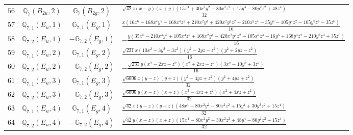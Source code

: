\documentclass[fleqn,8pt,landscape]{jsarticle}
\begin{document}
\begin{table}[ht!]
\begin{center}
\begin{tabular}{cccl}
$ 56 $ & $ \mathbb{Q}_{7}(B_{2u},2) $ & $ \mathbb{G}_{7}(B_{2g},2) $ & $ \frac{\sqrt{42} z \left(x - y\right) \left(x + y\right) \left(15 x^{4} + 30 x^{2} y^{2} - 80 x^{2} z^{2} + 15 y^{4} - 80 y^{2} z^{2} + 48 z^{4}\right)}{32} $ \\
$ 57 $ & $ \mathbb{Q}_{7,1}(E_{u},1) $ & $ \mathbb{G}_{7,1}(E_{g},1) $ & $ \frac{x \left(16 x^{6} - 168 x^{4} y^{2} - 168 x^{4} z^{2} + 210 x^{2} y^{4} + 420 x^{2} y^{2} z^{2} + 210 x^{2} z^{4} - 35 y^{6} - 105 y^{4} z^{2} - 105 y^{2} z^{4} - 35 z^{6}\right)}{16} $ \\
$ 58 $ & $ \mathbb{Q}_{7,2}(E_{u},1) $ & $ -\mathbb{G}_{7,2}(E_{g},1) $ & $ - \frac{y \left(35 x^{6} - 210 x^{4} y^{2} + 105 x^{4} z^{2} + 168 x^{2} y^{4} - 420 x^{2} y^{2} z^{2} + 105 x^{2} z^{4} - 16 y^{6} + 168 y^{4} z^{2} - 210 y^{2} z^{4} + 35 z^{6}\right)}{16} $ \\
$ 59 $ & $ \mathbb{Q}_{7,1}(E_{u},2) $ & $ \mathbb{G}_{7,1}(E_{g},2) $ & $ \frac{\sqrt{231} x \left(10 x^{2} - 3 y^{2} - 3 z^{2}\right) \left(y^{2} - 2 y z - z^{2}\right) \left(y^{2} + 2 y z - z^{2}\right)}{16} $ \\
$ 60 $ & $ \mathbb{Q}_{7,2}(E_{u},2) $ & $ -\mathbb{G}_{7,2}(E_{g},2) $ & $ - \frac{\sqrt{231} y \left(x^{2} - 2 x z - z^{2}\right) \left(x^{2} + 2 x z - z^{2}\right) \left(3 x^{2} - 10 y^{2} + 3 z^{2}\right)}{16} $ \\
$ 61 $ & $ \mathbb{Q}_{7,1}(E_{u},3) $ & $ \mathbb{G}_{7,1}(E_{g},3) $ & $ \frac{\sqrt{6006} x \left(y - z\right) \left(y + z\right) \left(y^{2} - 4 y z + z^{2}\right) \left(y^{2} + 4 y z + z^{2}\right)}{32} $ \\
$ 62 $ & $ \mathbb{Q}_{7,2}(E_{u},3) $ & $ -\mathbb{G}_{7,2}(E_{g},3) $ & $ \frac{\sqrt{6006} y \left(x - z\right) \left(x + z\right) \left(x^{2} - 4 x z + z^{2}\right) \left(x^{2} + 4 x z + z^{2}\right)}{32} $ \\
$ 63 $ & $ \mathbb{Q}_{7,1}(E_{u},4) $ & $ \mathbb{G}_{7,1}(E_{g},4) $ & $ \frac{\sqrt{42} x \left(y - z\right) \left(y + z\right) \left(48 x^{4} - 80 x^{2} y^{2} - 80 x^{2} z^{2} + 15 y^{4} + 30 y^{2} z^{2} + 15 z^{4}\right)}{32} $ \\
$ 64 $ & $ \mathbb{Q}_{7,2}(E_{u},4) $ & $ -\mathbb{G}_{7,2}(E_{g},4) $ & $ \frac{\sqrt{42} y \left(x - z\right) \left(x + z\right) \left(15 x^{4} - 80 x^{2} y^{2} + 30 x^{2} z^{2} + 48 y^{4} - 80 y^{2} z^{2} + 15 z^{4}\right)}{32} $ \\
 \hline \hline
\end{tabular}
\end{center}
\end{table}
\end{document}
